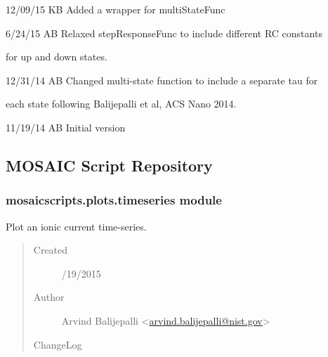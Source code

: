 \documentclass[letterpaper,10pt,english]{sphinxmanual}
\begin{document}
\begin{DUlineblock}{0em}
\item[] 12/09/15        KB      Added a wrapper for multiStateFunc
\item[] 6/24/15         AB      Relaxed stepResponseFunc to include different RC constants
\item[]
\begin{DUlineblock}{\DUlineblockindent}
\item[] for up and down states.
\end{DUlineblock}
\item[] 12/31/14        AB      Changed multi-state function to include a separate tau for
\item[]
\begin{DUlineblock}{\DUlineblockindent}
\item[] each state following Balijepalli et al, ACS Nano 2014.
\end{DUlineblock}
\item[] 11/19/14        AB      Initial version
\end{DUlineblock}


\subsection{MOSAIC Script Repository}
\label{api-doc/mosaicscripts:mosaic-script-repository}\label{api-doc/mosaicscripts::doc}

\subsubsection{mosaicscripts.plots.timeseries module}
\label{api-doc/mosaicscripts:module-mosaicscripts.plots.timeseries}\label{api-doc/mosaicscripts:mosaicscripts-plots-timeseries-module}
Plot an ionic current time-series.
\begin{quote}\begin{description}
\item[{Created}] /19/2015

\item[{Author}] \leavevmode
Arvind Balijepalli \textless{}\href{mailto:arvind.balijepalli@nist.gov}{arvind.balijepalli@nist.gov}\textgreater{}

\item[{ChangeLog}] \leavevmode
\end{description}\end{quote}
\end{document}

